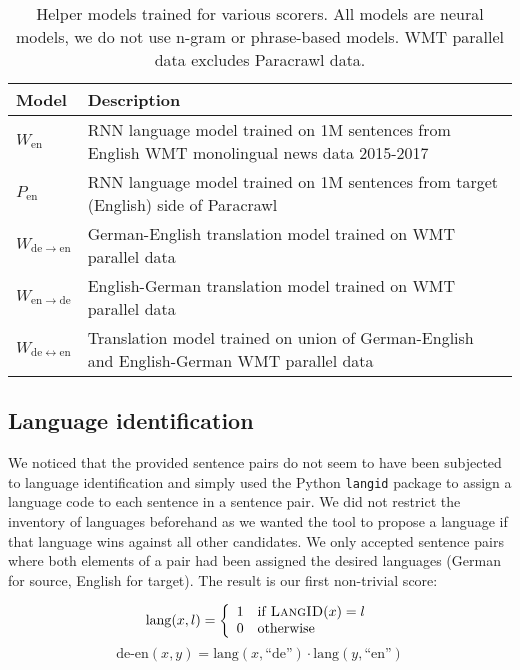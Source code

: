 \documentclass[11pt,a4paper]{article}
\begin{document}
\begin{table}[t]
\centering
\begin{tabular}{lp{5.5cm}}\toprule
Model & Description \\ \midrule
$W_{\mathrm{en}}$ & RNN language model trained on 1M sentences from English WMT monolingual news data 2015-2017 \\ 
$P_{\mathrm{en}}$ & RNN language model trained on 1M sentences from target (English) side of Paracrawl \\ \midrule
$W_{\mathrm{de}\rightarrow\mathrm{en}}$ & German-English translation model trained on WMT parallel data \\ $W_{\mathrm{en}\rightarrow\mathrm{de}}$ & English-German translation model trained on WMT parallel data \\ 
\midrule
$W_{\mathrm{de}\leftrightarrow\mathrm{en}}$ & Translation model trained on union of German-English and English-German WMT parallel data\\
\bottomrule
\end{tabular}
\caption{Helper models trained for various scorers. All models are neural models, we do not use n-gram or phrase-based models. WMT parallel data excludes Paracrawl data.}\label{helper}
\end{table}

\subsection{Language identification}

We noticed that the provided sentence pairs do not seem to have been subjected to language identification and simply used the Python \texttt{langid} package to assign a language code to each sentence in a sentence pair. We did not restrict the inventory of languages beforehand as we wanted the tool to propose a language if that language wins against all other candidates. We only accepted sentence pairs where both elements of a pair had been assigned the desired languages (German for source, English for target). The result is our first non-trivial score:

\begin{equation*}
\mathrm{lang}(x, l) = \left\{ 
\begin{array}{ll}
1 & \mathrm{if \; \textsc{LangID}}(x) = l \\ 
0 & \mathrm{otherwise} \\
\end{array} \right.
\end{equation*}
\begin{equation}
\mathrm{de\textrm{-}en}(x,y) = \mathrm{lang}(x, \textrm{``de''}) \cdot \mathrm{lang}(y, \textrm{``en''}) 
\end{equation}
\end{document}
